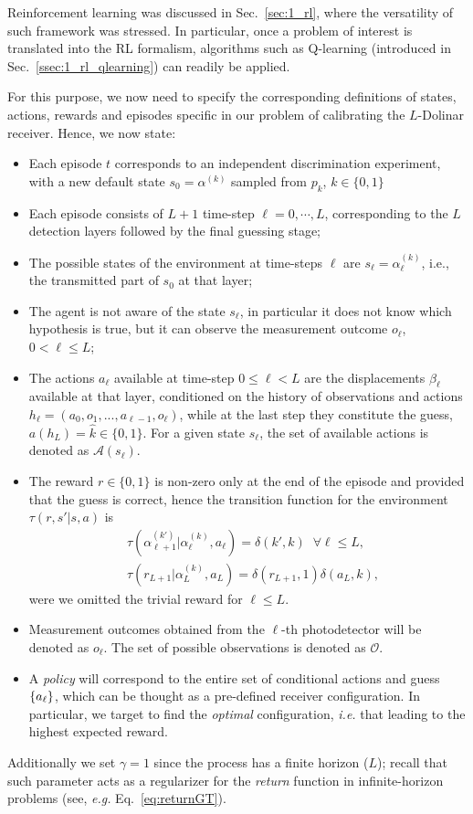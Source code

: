 Reinforcement learning was discussed in Sec.~\ref{sec:1_rl}, where the versatility of such framework was stressed. In particular, once a problem of interest is translated into the RL formalism, algorithms such as Q-learning (introduced in Sec.~\ref{ssec:1_rl_qlearning}) can readily be applied.%

For this purpose, we now need to specify the corresponding definitions of states, actions, rewards and episodes specific in our problem of calibrating the $L$-Dolinar receiver. Hence, we now state:
\begin{itemize}
\item Each episode $t$ corresponds to an independent discrimination experiment, with a new default state $s_{0}=\alpha^{(k)}$ sampled from $p_{k}$, $k\in\{0,1\}$
\item Each episode consists of $L+1$ time-step $\ell=0,\cdots,L$, corresponding to the $L$ detection layers followed by the final guessing stage;
\item The possible states of the environment at time-steps $\ell$ are $s_{\ell}=\alpha^{(k)}_{\ell}$, i.e., the transmitted part of $s_{0}$ at that layer;
\item The agent is not aware of the state $s_{\ell}$, in particular it does not know which hypothesis is true, but it can observe the measurement outcome $o_{\ell}$, $0 < \ell \leq L$;
\item The actions $a_\ell$ available at time-step $0 \leq \ell <L$ are the displacements $\beta_{\ell}$ available at that layer, conditioned on the history of observations and actions $h_{\ell}=(a_0, o_1, ...,a_{\ell-1},o_\ell)$, while at the last step they constitute the guess, $a(h_{L})=\hat{k}\in\{0,1\}$. For a given state $s_\ell$, the set of available actions is denoted as $\mathcal{A}(s_{\ell})$.
\item The reward $r\in\{0,1\}$ is non-zero only at the end of the episode and provided that the guess is correct, hence the transition function for the environment $\tau(r,s'|s,a)$ is
\begin{align}\label{eq:sTr}
&\tau(\alpha^{(k')}_{\ell+1}|\alpha^{(k)}_\ell,a_{\ell})=\delta(k',k)\;\;\forall\ell\leq L,\\
&\tau(r_{L+1}|\alpha^{(k)}_L,a_L)=\delta(r_{L+1},1)\delta(a_L,k),
\end{align}
were we omitted the trivial reward for $\ell\leq L$.
\item Measurement outcomes obtained from the $\ell$-th photodetector will be denoted as $o_\ell$. The set of possible observations is denoted as $\mathcal{O}$.
\item A \textit{policy} will correspond to the entire set of conditional actions and guess $\lbrace a_\ell\rbrace$, which can be thought as a pre-defined receiver configuration. In particular, we target to find the \textit{optimal} configuration, \textit{i.e.} that leading to the highest expected reward.
\end{itemize}
Additionally we set $\gamma=1$ since the process has a finite horizon ($L$); recall that such parameter acts as a regularizer for the \textit{return} function in infinite-horizon problems (see, \textit{e.g.} Eq.~\ref{eq:returnGT}).

